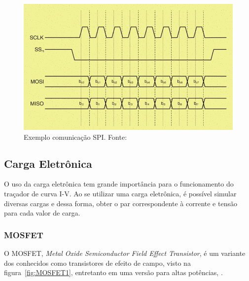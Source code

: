 \FloatBarrier
\begin{figure}[!htbp]
	\centering
	\includegraphics[scale=0.7]{imagens/SPI}
	\caption{Exemplo comunicação SPI. Fonte:  %
	}
	\label{fig:SPI}
\end{figure}
\FloatBarrier



\subsection{Carga Eletrônica}

O uso da carga eletrônica tem grande importância para o funcionamento do traçador de curva I-V. Ao se utilizar uma carga eletrônica, é possível simular diversas cargas e dessa forma, obter o par correspondente à corrente e tensão para cada valor de carga.

\subsubsection{MOSFET}

O MOSFET, \textit{Metal Oxide Semiconductor Field Effect Transistor}, é um variante dos conhecidos como transistores de efeito de campo, visto na figura~\ref{fig:MOSFET1}, entretanto em uma versão para altas potências, \cite{ART977}.

